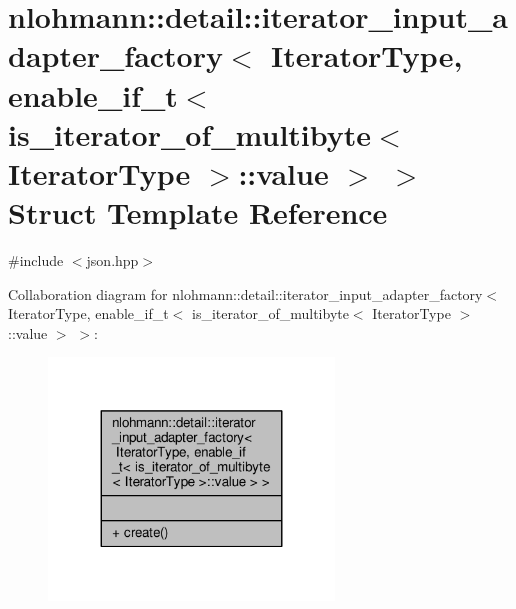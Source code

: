 \hypertarget{structnlohmann_1_1detail_1_1iterator__input__adapter__factory_3_01IteratorType_00_01enable__if__0e86378a778d78dd2284e92dc30f4902}{}\section{nlohmann\+:\+:detail\+:\+:iterator\+\_\+input\+\_\+adapter\+\_\+factory$<$ Iterator\+Type, enable\+\_\+if\+\_\+t$<$ is\+\_\+iterator\+\_\+of\+\_\+multibyte$<$ Iterator\+Type $>$\+:\+:value $>$ $>$ Struct Template Reference}
\label{structnlohmann_1_1detail_1_1iterator__input__adapter__factory_3_01IteratorType_00_01enable__if__0e86378a778d78dd2284e92dc30f4902}


{\ttfamily \#include $<$json.\+hpp$>$}



Collaboration diagram for nlohmann\+:\+:detail\+:\+:iterator\+\_\+input\+\_\+adapter\+\_\+factory$<$ Iterator\+Type, enable\+\_\+if\+\_\+t$<$ is\+\_\+iterator\+\_\+of\+\_\+multibyte$<$ Iterator\+Type $>$\+:\+:value $>$ $>$\+:
\nopagebreak
\begin{figure}[H]
\begin{center}
\leavevmode
\includegraphics[width=215pt]{structnlohmann_1_1detail_1_1iterator__input__adapter__factory_3_01IteratorType_00_01enable__if__cdc8983becf67799b21e4625c4f05034}
\end{center}
\end{figure}
